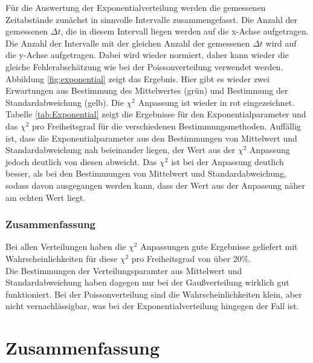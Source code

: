 \documentclass[12pt,a4paper]{article}
\begin{document}
Für die Auswertung der Exponentialverteilung werden die gemessenen Zeitabstände zunächst in sinnvolle Intervalle zusammengefasst. Die Anzahl der gemessenen $\Delta t$, die in diesem Intervall liegen werden auf die x-Achse aufgetragen. Die Anzahl der Intervalle mit der gleichen Anzahl der gemessenen $\Delta t$ wird auf die y-Achse aufgetragen. Dabei wird wieder normiert, daher kann wieder die gleiche Fehlerabschätzung wie bei der Poissonverteilung verwendet werden. Abbildung \ref{fig:exponential} zeigt das Ergebnis. Hier gibt es wieder zwei Erwartungen aus Bestimmung des Mittelwertes (grün) und Bestimmung der Standardabweichung (gelb). Die $\chi ^2$ Anpassung ist wieder in rot eingezeichnet.\\
Tabelle \ref{tab:Exponential} zeigt die Ergebnisse für den Exponentialparameter und das $\chi ^2$ pro Freiheitsgrad für die verschiedenen Bestimmungsmethoden. Auffällig ist, dass die Exponentialparameter aus den Bestimmungen von Mittelwert und Standardabweichung nah beieinander liegen, der Wert aus der $\chi ^2$ Anpassung jedoch deutlich von diesen abweicht. Das $\chi ^2$ ist bei der Anpassung deutlich besser, als bei den Bestimmungen von Mittelwert und Standardabweichung, sodass davon ausgegangen werden kann, dass der Wert aus der Anpassung näher am echten Wert liegt.

\subsubsection{Zusammenfassung}
Bei allen Verteilungen haben die $\chi ^2$ Anpassungen gute Ergebnisse geliefert mit Wahrscheinlichkeiten für diese $\chi ^2$ pro Freiheitsgrad von über 20\%. \\
Die Bestimmungen der Verteilungsparamter aus Mittelwert und Standardabweichung haben dagegen nur bei der Gaußverteilung wirklich gut funktioniert. Bei der Poissonverteilung sind die Wahrscheinlichkeiten klein, aber nicht vernachlässigbar, was bei der Exponentialverteilung hingegen der Fall ist.

\section{Zusammenfassung}
\end{document}
